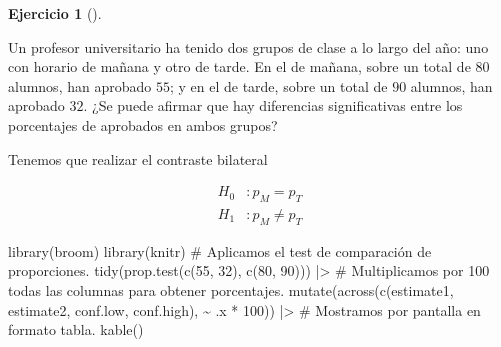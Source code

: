 \documentclass[
  a4paper,
]{scrreport}
\newenvironment{Shaded}{\begin{snugshade}}{\end{snugshade}}
\newcommand{\CommentTok}[1]{\textcolor[rgb]{0.37,0.37,0.37}{#1}}
\newcommand{\DecValTok}[1]{\textcolor[rgb]{0.68,0.00,0.00}{#1}}
\newcommand{\FunctionTok}[1]{\textcolor[rgb]{0.28,0.35,0.67}{#1}}
\newcommand{\NormalTok}[1]{\textcolor[rgb]{0.00,0.23,0.31}{#1}}
\newcommand{\SpecialCharTok}[1]{\textcolor[rgb]{0.37,0.37,0.37}{#1}}
\theoremstyle{definition}
\newtheorem{exercise}{Ejercicio}[chapter]
\theoremstyle{remark}
\begin{document}
\begin{exercise}[]\protect\hypertarget{exr-contraste-hipotesis-proporciones-aprobados}{}\label{exr-contraste-hipotesis-proporciones-aprobados}

Un profesor universitario ha tenido dos grupos de clase a lo largo del
año: uno con horario de mañana y otro de tarde. En el de mañana, sobre
un total de \(80\) alumnos, han aprobado \(55\); y en el de tarde, sobre
un total de \(90\) alumnos, han aprobado \(32\). ¿Se puede afirmar que
hay diferencias significativas entre los porcentajes de aprobados en
ambos grupos?

\begin{tcolorbox}[enhanced jigsaw, colframe=quarto-callout-tip-color-frame, toprule=.15mm, bottomtitle=1mm, breakable, opacitybacktitle=0.6, toptitle=1mm, colback=white, bottomrule=.15mm, title=\textcolor{quarto-callout-tip-color}{\faLightbulb}\hspace{0.5em}{Solución}, arc=.35mm, left=2mm, titlerule=0mm, rightrule=.15mm, coltitle=black, leftrule=.75mm, opacityback=0, colbacktitle=quarto-callout-tip-color!10!white]

Tenemos que realizar el contraste bilateral

\begin{align*}
H_0 &: p_M = p_T \\
H_1 &: p_M \neq p_T 
\end{align*}

\begin{Shaded}
\begin{Highlighting}[]
\FunctionTok{library}\NormalTok{(broom)}
\FunctionTok{library}\NormalTok{(knitr) }
\CommentTok{\# Aplicamos el test de comparación de proporciones.}
\FunctionTok{tidy}\NormalTok{(}\FunctionTok{prop.test}\NormalTok{(}\FunctionTok{c}\NormalTok{(}\DecValTok{55}\NormalTok{, }\DecValTok{32}\NormalTok{), }\FunctionTok{c}\NormalTok{(}\DecValTok{80}\NormalTok{, }\DecValTok{90}\NormalTok{))) }\SpecialCharTok{|\textgreater{}} 
    \CommentTok{\# Multiplicamos por 100 todas las columnas para obtener porcentajes.}
    \FunctionTok{mutate}\NormalTok{(}\FunctionTok{across}\NormalTok{(}\FunctionTok{c}\NormalTok{(estimate1, estimate2, conf.low, conf.high), }\SpecialCharTok{\textasciitilde{}}\NormalTok{ .x }\SpecialCharTok{*} \DecValTok{100}\NormalTok{)) }\SpecialCharTok{|\textgreater{}} 
    \CommentTok{\# Mostramos por pantalla en formato tabla.}
    \FunctionTok{kable}\NormalTok{()}
\end{Highlighting}
\end{Shaded}


\end{tcolorbox}
\end{exercise}
\end{document}
